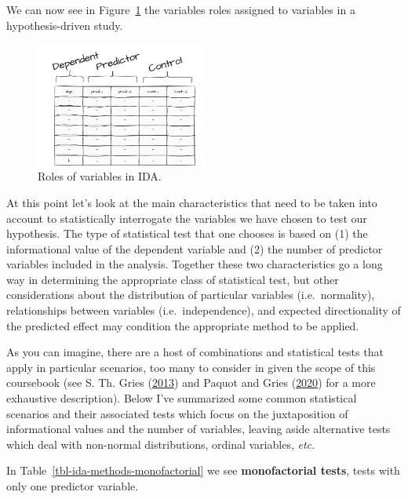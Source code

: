 \documentclass[
  letterpaper,
  DIV=11,
  numbers=noendperiod]{scrreport}
\theoremstyle{definition}
\theoremstyle{remark}
\begin{document}
We can now see in Figure~\ref{fig-aa-ida-variables} the variables roles
assigned to variables in a hypothesis-driven study.

\begin{figure}[H]

{\centering \includegraphics[width=0.5\textwidth,height=\textheight]{figures/approaching-analysis/aa-ida-variables.drawio.png}

}

\caption{\label{fig-aa-ida-variables}Roles of variables in IDA.}

\end{figure}

At this point let's look at the main characteristics that need to be
taken into account to statistically interrogate the variables we have
chosen to test our hypothesis. The type of statistical test that one
chooses is based on (1) the informational value of the dependent
variable and (2) the number of predictor variables included in the
analysis. Together these two characteristics go a long way in
determining the appropriate class of statistical test, but other
considerations about the distribution of particular variables
(i.e.~normality), relationships between variables (i.e.~independence),
and expected directionality of the predicted effect may condition the
appropriate method to be applied.

As you can imagine, there are a host of combinations and statistical
tests that apply in particular scenarios, too many to consider in given
the scope of this coursebook (see S. Th. Gries
(\protect\hyperlink{ref-Gries2013a}{2013}) and Paquot and Gries
(\protect\hyperlink{ref-Paquot2020a}{2020}) for a more exhaustive
description). Below I've summarized some common statistical scenarios
and their associated tests which focus on the juxtaposition of
informational values and the number of variables, leaving aside
alternative tests which deal with non-normal distributions, ordinal
variables, \emph{etc.}

In Table~\ref{tbl-ida-methods-monofactorial} we see
\textbf{monofactorial tests}, tests with only one predictor variable.
\end{document}
